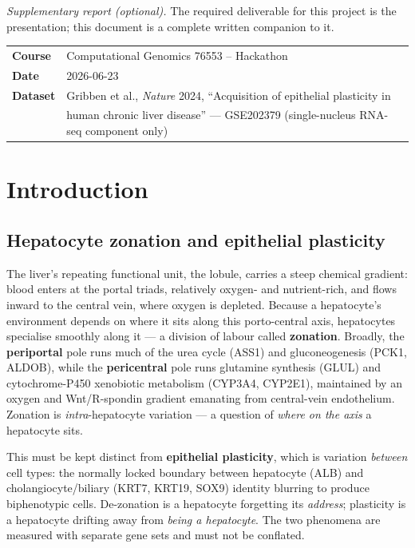 \documentclass[11pt,a4paper]{article}
\begin{document}
\setcounter{tocdepth}{2}
\begingroup\renewcommand{\contentsname}{\normalsize Contents}{\small\tableofcontents}\endgroup
\vspace{0.6em}

\noindent\textit{Supplementary report (optional).} The required deliverable for this project is the presentation; this document is a complete written companion to it.

\vspace{0.4em}
\begin{table}[H]
\centering\small
\begin{tabular}{ll}
\toprule
\textbf{Course} & Computational Genomics 76553 -- Hackathon \\
\textbf{Date} & 2026-06-23 \\
\textbf{Dataset} & Gribben et al., \emph{Nature} 2024, ``Acquisition of epithelial plasticity in \\
 & human chronic liver disease'' --- GSE202379 (single-nucleus RNA-seq component only) \\
\bottomrule
\end{tabular}
\end{table}

\section{Introduction}

\subsection{Hepatocyte zonation and epithelial plasticity}

The liver's repeating functional unit, the lobule, carries a steep chemical gradient: blood enters at the portal triads, relatively oxygen- and nutrient-rich, and flows inward to the central vein, where oxygen is depleted. Because a hepatocyte's environment depends on where it sits along this porto-central axis, hepatocytes specialise smoothly along it --- a division of labour called \textbf{zonation}. Broadly, the \textbf{periportal} pole runs much of the urea cycle (ASS1) and gluconeogenesis (PCK1, ALDOB), while the \textbf{pericentral} pole runs glutamine synthesis (GLUL) and cytochrome-P450 xenobiotic metabolism (CYP3A4, CYP2E1), maintained by an oxygen and Wnt/R-spondin gradient emanating from central-vein endothelium. Zonation is \emph{intra}-hepatocyte variation --- a question of \emph{where on the axis} a hepatocyte sits.

This must be kept distinct from \textbf{epithelial plasticity}, which is variation \emph{between} cell types: the normally locked boundary between hepatocyte (ALB) and cholangiocyte/biliary (KRT7, KRT19, SOX9) identity blurring to produce biphenotypic cells. De-zonation is a hepatocyte forgetting its \emph{address}; plasticity is a hepatocyte drifting away from \emph{being a hepatocyte}. The two phenomena are measured with separate gene sets and must not be conflated.
\end{document}
